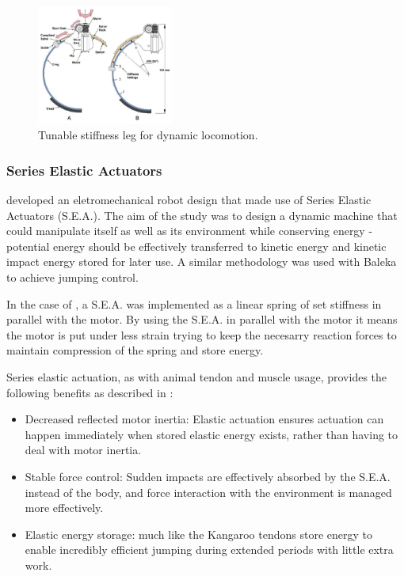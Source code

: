 \begin{figure}
\centering
\includegraphics[width=0.4\textwidth]{images/literature/tunable-stiffness-leg.png} 
\caption{Tunable stiffness leg for dynamic locomotion.\cite{GallowayKevinCandClarkJonathanEandKoditschek2009}}
\label{fig:Tunable stiffness leg}
\end{figure}

\subsubsection{Series Elastic Actuators}

\cite{Kenneally2014} developed an eletromechanical robot design that made use of Series Elastic Actuators (S.E.A.). The aim of the study was to design a dynamic machine that could manipulate itself as well as its environment while conserving energy - potential energy should be effectively transferred to kinetic energy and kinetic impact energy stored for later use.\cite{Kenneally2014} A similar methodology was used with Baleka to achieve jumping control.

In the case of \cite{Kenneally2014}, a S.E.A. was implemented as a linear spring of set stiffness in parallel with the motor. By using the S.E.A. in parallel with the motor it means the motor is put under less strain trying to keep the necesarry reaction forces to maintain compression of the spring and store energy.\cite{Kenneally2014}

Series elastic actuation, as with animal tendon and muscle usage, provides the following benefits as described in \cite{Kenneally2014}:
\begin{itemize}
\item Decreased reflected motor inertia: Elastic actuation ensures actuation can happen immediately when stored elastic energy exists, rather than having to deal with motor inertia.
\item Stable force control: Sudden impacts are effectively absorbed by the S.E.A. instead of the body, and force interaction with the environment is managed more effectively.
\item Elastic energy storage: much like the Kangaroo tendons store energy to enable incredibly efficient jumping during extended periods with little extra work. 
\end{itemize}

